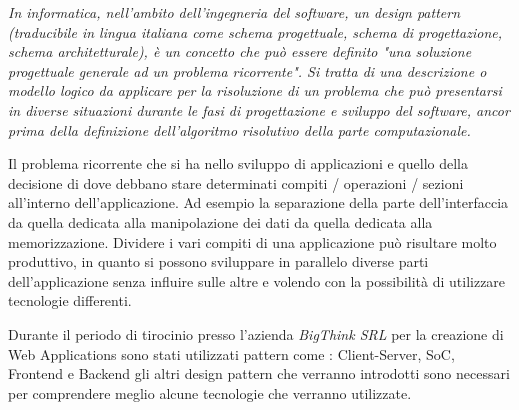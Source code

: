\emph{In informatica, nell'ambito dell'ingegneria del software, un design pattern (traducibile in lingua italiana come schema progettuale, schema di progettazione, schema architetturale), è un concetto che può essere definito "una soluzione progettuale generale ad un problema ricorrente". Si tratta di una descrizione o modello logico da applicare per la risoluzione di un problema che può presentarsi in diverse situazioni durante le fasi di progettazione e sviluppo del software, ancor prima della definizione dell'algoritmo risolutivo della parte computazionale.}
\hspace*{\fill}\cite{wiki:design_pattern} 

Il problema ricorrente che si ha nello sviluppo di applicazioni e quello della decisione di dove debbano stare determinati compiti / operazioni / sezioni all'interno dell'applicazione. Ad esempio la separazione della parte dell'interfaccia da quella dedicata alla manipolazione dei dati da quella dedicata alla memorizzazione. Dividere i vari compiti di una applicazione può risultare molto produttivo, in quanto si possono sviluppare in parallelo diverse parti dell'applicazione senza influire sulle altre e volendo con la possibilità di utilizzare tecnologie differenti.

Durante il periodo di tirocinio presso l'azienda \emph{BigThink SRL} per la creazione di Web Applications sono stati utilizzati pattern come : Client-Server, SoC, Frontend e Backend gli altri design pattern che verranno introdotti sono necessari per comprendere meglio alcune tecnologie che verranno utilizzate.
 
